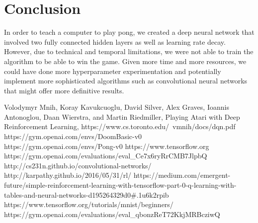 \documentclass[12pt]{article}
\theoremstyle{plain}
\theoremstyle{definition}
\theoremstyle{remark}
\theoremstyle{plain}
\begin{document}
\section{Conclusion}
In order to teach a computer to play pong, we created a deep neural network that involved two fully connected hidden layers as well as learning rate decay.  However, due to technical and temporal limitations, we were not able to train the algorithm to be able to win the game.  Given more time and more resources, we could have done more hyperparameter experimentation and potentially implement more sophisticated algorithms such as convolutional neural networks that might offer more definitive results.

\begin{thebibliography}{9}
 Volodymyr Mnih, Koray Kavukcuoglu, David Silver, Alex Graves, Ioannis Antonoglou,
Daan Wierstra, and Martin Riedmiller, Playing Atari with Deep Reinforcement Learning, https://www.cs.toronto.edu/~vmnih/docs/dqn.pdf 
 
 https://gym.openai.com/envs/DoomBasic-v0
 https://gym.openai.com/envs/Pong-v0
 https://www.tensorflow.org
 https://gym.openai.com/evaluations/eval\_Ce7x6ryRrCMB7JlpbQ 
 http://cs231n.github.io/convolutional-networks/
 http://karpathy.github.io/2016/05/31/rl/
 https://medium.com/emergent-future/simple-reinforcement-learning-with-tensorflow-part-0-q-learning-with-tables-and-neural-networks-d195264329d0\#.1u6k2rpib
 https://www.tensorflow.org/tutorials/mnist/beginners/
 https://gym.openai.com/evaluations/eval\_qbonzReT72KkjMRBcziwQ
\end{thebibliography}
\end{document}

